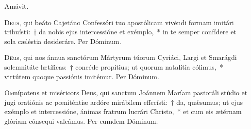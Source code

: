 \documentclass[vesperale_romanum.tex]{subfiles}
\begin{document}


\omniapraeter



\myrule


\duplex



\vv Amávit.

\oratio

\lettrine{D}{eus}, qui beáto Cajetáno Confessóri tuo apostólicam vivéndi formam imitári tribuísti:~† da nobis ejus intercessióne et exémplo,~* in te semper confídere et sola cæléstia desideráre. Per Dóminum.



\commemoration

\myrule



\oratio

\lettrine{D}{e}us, qui nos ánnua san\-ctórum Mártyrum túorum Cyriáci, Largi et Smarágdi solemnitáte lætíficas:~† concéde propítius; ut quorum natalítia cólimus,~*  virtútem quoque passiónis
imitémur. Per Dóminum.


\myrule

\duplexmtv

\oratio

\lettrine{O}{m}nípotens et miséricors Deus, qui san\-ctum Joánnem Maríam pastoráli stúdio et jugi oratiónis ac pœniténtiæ ardóre mirábilem effecísti:~† da, quǽsumus; ut ejus exémplo et intercessióne, ánimas fratrum lucrári Christo,~* et cum eis ætérnam glóriam cónsequi valeámus. Per eumdem Dóminum.
\end{document}
